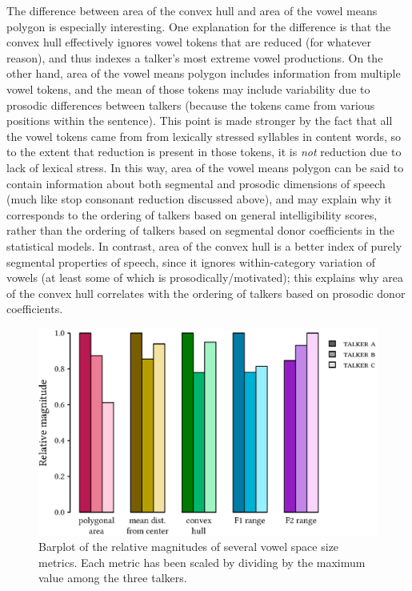 The difference between area of the convex hull and area of the vowel means polygon is especially interesting.  One explanation for the difference is that the convex hull effectively ignores vowel tokens that are reduced (for whatever reason), and thus indexes a talker’s most extreme vowel productions.  On the other hand, area of the vowel means polygon includes information from multiple vowel tokens, and the mean of those tokens may include variability due to prosodic differences between talkers (because the tokens came from various positions within the sentence).  This point is made stronger by the fact that all the vowel tokens came from from lexically stressed syllables in content words, so to the extent that reduction is present in those tokens, it is \emph{not} reduction due to lack of lexical stress.  In this way, area of the vowel means polygon can be said to contain information about both segmental and prosodic dimensions of speech (much like stop consonant reduction discussed above), and may explain why it corresponds to the ordering of talkers based on general intelligibility scores, rather than the ordering of talkers based on segmental donor coefficients in the statistical models.  In contrast, area of the convex hull is a better index of purely segmental properties of speech, since it ignores within-category variation of vowels (at least some of which is prosodically\-/motivated); this explains why area of the convex hull correlates with the ordering of talkers based on prosodic donor coefficients.


\begin{figure}
	\begin{centering}
	\includegraphics{figures/posthocs/VowelSpace.eps}
	\caption[Barplot of vowel space size metrics]{Barplot of the relative magnitudes of several vowel space size metrics.  Each metric has been scaled by dividing by the maximum value among the three talkers.\label{fig:VowelSpace}}
	\end{centering}
\end{figure}

